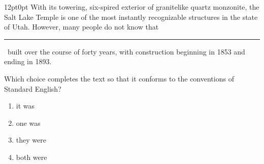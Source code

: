\documentclass[11pt, twocolumn]{article}
\newcounter{questionnum}
\begin{document}
\vspace{6pt}\noindent
\begin{minipage}{\columnwidth}\raggedright
\noindent{}\par\vspace{8pt}
\begin{adjustwidth}{12pt}{0pt}
With its towering, six-spired exterior of granitelike quartz monzonite, the Salt Lake Temple is one of the most instantly recognizable structures in the state of Utah. However, many people do not know that \,\rule{2cm}{0.4pt}\, built over the course of forty years, with construction beginning in 1853 and ending in 1893.
\vspace{6pt}

Which choice completes the text so that it conforms to the conventions of Standard English?
\begin{enumerate}[label=\Alph*),leftmargin=18pt,topsep=3pt,itemsep=2pt]
  \item it was
  \item one was
  \item they were
  \item both were
\end{enumerate}
\end{adjustwidth}
\end{minipage}\par
\end{document}
